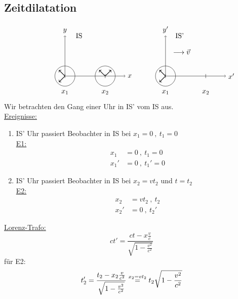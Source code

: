 \documentclass[titlepage,12pt,a4paper,ngerman]{report}
\begin{document}
{\subsection{Zeitdilatation}
$$
\begin{tikzpicture}
\draw[->] (-5,0) -- (3-5,0) node[right] {$x$}; 
\draw[->] (-5,0) -- (-5,2) node[above] {$y$};
\node at (.7-5,2) [align=flush center,text width=5cm]
{IS};
\node at (-4.2+5,1.2) [align=flush center,text width=5cm]
{$\longrightarrow \vec{v}$};
\draw (-5,0) circle(0.5cm);
\draw (2-5,0) circle(0.5cm);
\draw[thick,->] (-5,0) -- (-0.3-5,0.3);
\draw[thick,->] (2-5,0) -- (1.7-5,0.3);
\draw[thick,->] (-5,0) -- (-0.3-5,-0.3);
\draw[thick,->] (2-5,0) -- (2.3-5,0.3);
\draw (-5,-.1) -- (-5,.1);
\draw (2-5,-.1) -- (2-5,.1);
\node at (-5,-.8) {$x_1$};
\node at (2-5,-.8) {$x_2$};
\draw[->] (0,0) -- (3,0) node[right] {$x'$}; 
\draw[->] (0,0) -- (0,2) node[above] {$y'$};
\node at (0.7,2) [align=flush center,text width=5cm]
{IS'};
\draw (0,0) circle(0.5cm);
\draw[thick,->] (0,0) -- (-0.3,0.3);
\draw[thick,->] (0,0) -- (-0.3,-0.3);
\draw (0,-.1) -- (0,.1);
\draw (2,-.1) -- (2,.1);
\node at (0,-.8) {$x_1$};
\node at (2,-.8) {$x_2$};
\end{tikzpicture}$$
Wir betrachten den Gang einer Uhr in IS' vom IS aus.\\
\underline{Ereignisse:}
\begin{enumerate}[1)]
	\item IS' Uhr passiert Beobachter in IS bei $ x_1 = 0\ , \ t_1 = 0 $\\
	\underline{E1:}
	\begin{align*}
	x_1 &= 0 \ , \ t_1 = 0 \\
	x_1' &= 0 \ , \ t_1' = 0
	\end{align*}
	\item IS' Uhr passiert Beobachter in IS bei $ x_2 = v t_2 $ und $ t = t_2 $\\
	\underline{E2:}
	\begin{align*}
	x_2 &= v t_2 \ , \ t_2\\
	x_2' &= 0 \ , \ t_2'
	\end{align*}
\end{enumerate}
\underline{Lorenz-Trafo:}
\begin{equation*}
ct' = \frac{ct - x \frac{v}{c}}{\sqrt{1 - \frac{v^2}{c^2}}}
\end{equation*}
für E2:
\begin{equation*}
t_2' = \frac{t_2 - x_2 \frac{v}{c^2}}{\sqrt{1 - \frac{v^2}{c^2}}} \buildrel x_2 = v t_2 \over = t_2 \sqrt{1 - \frac{v^2}{c^2}}

\end{equation*}}
\end{document}
